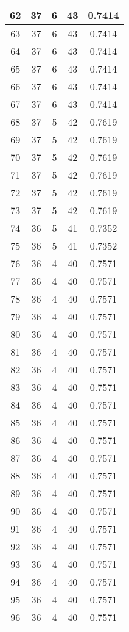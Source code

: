 \documentclass[letterpaper, 12pt]{article}
\begin{document}
\begin{longtable}{|c|c|c|c|c|}
\hline
62 & 37 & 6 & 43 & 0.7414 \\
\hline
63 & 37 & 6 & 43 & 0.7414 \\
\hline
64 & 37 & 6 & 43 & 0.7414 \\
\hline
65 & 37 & 6 & 43 & 0.7414 \\
\hline
66 & 37 & 6 & 43 & 0.7414 \\
\hline
67 & 37 & 6 & 43 & 0.7414 \\
\hline
68 & 37 & 5 & 42 & 0.7619 \\
\hline
69 & 37 & 5 & 42 & 0.7619 \\
\hline
70 & 37 & 5 & 42 & 0.7619 \\
\hline
71 & 37 & 5 & 42 & 0.7619 \\
\hline
72 & 37 & 5 & 42 & 0.7619 \\
\hline
73 & 37 & 5 & 42 & 0.7619 \\
\hline
74 & 36 & 5 & 41 & 0.7352 \\
\hline
75 & 36 & 5 & 41 & 0.7352 \\
\hline
76 & 36 & 4 & 40 & 0.7571 \\
\hline
77 & 36 & 4 & 40 & 0.7571 \\
\hline
78 & 36 & 4 & 40 & 0.7571 \\
\hline
79 & 36 & 4 & 40 & 0.7571 \\
\hline
80 & 36 & 4 & 40 & 0.7571 \\
\hline
81 & 36 & 4 & 40 & 0.7571 \\
\hline
82 & 36 & 4 & 40 & 0.7571 \\
\hline
83 & 36 & 4 & 40 & 0.7571 \\
\hline
84 & 36 & 4 & 40 & 0.7571 \\
\hline
85 & 36 & 4 & 40 & 0.7571 \\
\hline
86 & 36 & 4 & 40 & 0.7571 \\
\hline
87 & 36 & 4 & 40 & 0.7571 \\
\hline
88 & 36 & 4 & 40 & 0.7571 \\
\hline
89 & 36 & 4 & 40 & 0.7571 \\
\hline
90 & 36 & 4 & 40 & 0.7571 \\
\hline
91 & 36 & 4 & 40 & 0.7571 \\
\hline
92 & 36 & 4 & 40 & 0.7571 \\
\hline
93 & 36 & 4 & 40 & 0.7571 \\
\hline
94 & 36 & 4 & 40 & 0.7571 \\
\hline
95 & 36 & 4 & 40 & 0.7571 \\
\hline
96 & 36 & 4 & 40 & 0.7571 \\

\end{longtable}
\end{document}
